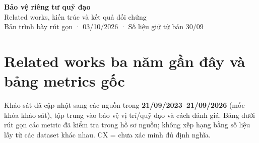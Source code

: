 \documentclass[10pt,a4paper]{article}
\begin{document}
\begin{center}{\LARGE\bfseries\color{ink}Bảo vệ riêng tư quỹ đạo}\\[5pt]{\large Related works, kiến trúc và kết quả đối chứng}\\[4pt]{\small Bản trình bày rút gọn · 03/10/2026 · Số liệu giữ từ bản 30/09}\end{center}
\section{Related works ba năm gần đây và bảng metrics gốc}\label{sec:1}
Khảo sát đã cập nhật sang các nguồn trong \textbf{21/09/2023–21/09/2026} (mốc khóa khảo sát), tập trung vào bảo vệ vị trí/quỹ đạo và cách đánh giá. Bảng dưới rút gọn các metric đã kiểm tra trong hồ sơ nguồn; không xếp hạng bằng số liệu lấy từ các dataset khác nhau. CX = chưa xác minh đủ định nghĩa.
\end{document}

